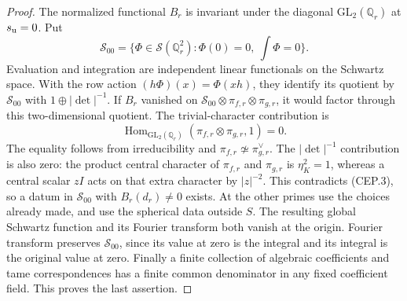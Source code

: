 \begin{proof}
The normalized functional $B_r$ is invariant under the
diagonal $\mathrm{GL}_2(\mathbb Q_r)$ at $s_{\rm u}=0$.
Put
\[
 \mathcal S_{00}=
 \{\Phi\in\mathcal S(\mathbb Q_r^2):
           \Phi(0)=0,\ \int\Phi=0\}.
\]
Evaluation and integration are independent linear
functionals on the Schwartz space.  With the row
action $(h\Phi)(x)=\Phi(xh)$, they identify its quotient
by $\mathcal S_{00}$ with
$1\oplus|\det|^{-1}$.
If $B_r$ vanished on
$\mathcal S_{00}\otimes\pi_{f,r}\otimes\pi_{g,r}$,
it would factor through this two-dimensional quotient.
The trivial-character contribution is
\[
 \operatorname{Hom}_{\mathrm{GL}_2(\mathbb Q_r)}
                 (\pi_{f,r}\otimes\pi_{g,r},1)=0.
\]
The equality follows from irreducibility and
$\pi_{f,r}\not\simeq\pi_{g,r}^{\vee}$.
The $|\det|^{-1}$ contribution is also zero:
the product central character of $\pi_{f,r}$ and
$\pi_{g,r}$ is $\eta_K^2=1$, whereas a central
scalar $zI$ acts on that extra character by $|z|^{-2}$.
This contradicts (CEP.3), so a datum in
$\mathcal S_{00}$ with $B_r(d_r)\ne0$ exists.
At the other primes use the choices already made, and use
the spherical data outside $S$.  The resulting global
Schwartz function and its Fourier transform both vanish
at the origin.  Fourier transform preserves
$\mathcal S_{00}$, since its value at zero is the
integral and its integral is the original value at zero.
Finally a finite collection of algebraic coefficients and
tame correspondences has a finite common denominator in
any fixed coefficient field.  This proves the last assertion.
\end{proof}

